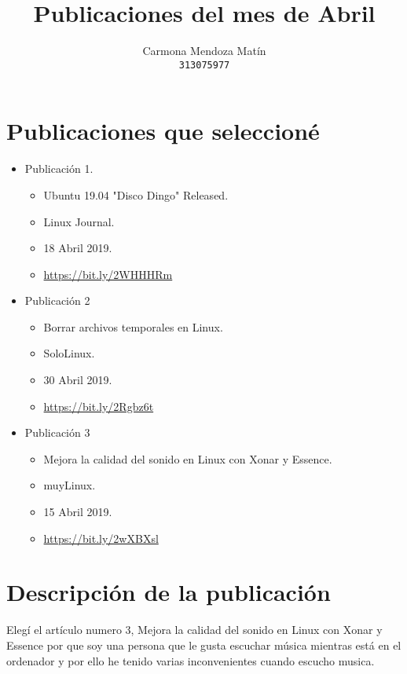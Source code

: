 \documentclass[11pt, a4paper]{report}
\begin{document}
\title{Publicaciones del mes de Abril}
\author{
  Carmona Mendoza Mat\'in\\
  \texttt{313075977}
}
\date{}
\maketitle

\section*{Publicaciones que seleccioné}
\begin{itemize}

\item Publicación 1.
  \begin{itemize}
  \item Ubuntu 19.04 "Disco Dingo" Released.
  \item Linux Journal.
  \item 18 Abril 2019.
  \item \url{https://bit.ly/2WHHHRm}
  \end{itemize}
  
\item Publicación 2
  \begin{itemize}
  \item Borrar archivos temporales en Linux.
  \item SoloLinux.
  \item 30 Abril 2019. 
  \item \url{https://bit.ly/2Rgbz6t}
  \end{itemize}

\item Publicación 3
  \begin{itemize}
  \item Mejora la calidad del sonido en Linux con Xonar y Essence.
  \item muyLinux.
  \item 15 Abril 2019.
  \item \url{https://bit.ly/2wXBXsl}
  \end{itemize}
\end{itemize}  

\section*{Descripción de la publicación}
Elegí el artículo numero 3, Mejora la calidad del sonido en Linux con Xonar y
Essence por que soy una persona que le gusta escuchar música mientras está en el
ordenador y por ello he tenido varias inconvenientes cuando escucho musica. \\
\end{document}

